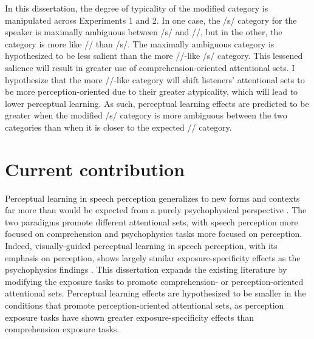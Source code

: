 In this dissertation, the degree of typicality of the modified category is manipulated across Experiments 1 and 2.  
In one case, the /s/ category for the speaker is maximally ambiguous between /s/ and /\textesh/, but in the other, the category is more like /\textesh/ than /s/.
The maximally ambiguous category is hypothesized to be less salient than the more /\textesh/-like /s/ category.
This lessened salience will result in greater use of comprehension-oriented attentional sets.
I hypothesize that the more /\textesh/-like category will shift listeners' attentional sets to be more perception-oriented due to their greater atypicality, which will lead to lower perceptual learning.
As such, perceptual learning effects are predicted to be greater when the modified /s/ category is more ambiguous between the two categories than when it is closer to the expected /\textesh/ category.

\section{Current contribution}

Perceptual learning in speech perception generalizes to new forms and contexts far more than would be expected from a purely psychophysical perspective \citep{Norris2003,Gilbert2001}.
The two paradigms promote different attentional sets, with speech perception more focused on comprehension and psychophysics tasks more focused on perception.  
Indeed, visually-guided perceptual learning in speech perception, with its emphasis on perception, shows largely similar exposure-specificity effects as the psychophysics findings \citep{Reinisch2014}.
This dissertation expands the existing literature by modifying the exposure tasks to promote comprehension- or perception-oriented attentional sets.
Perceptual learning effects are hypothesized to be smaller in the conditions that promote perception-oriented attentional sets, as perception exposure tasks have shown greater exposure-specificity effects than comprehension exposure tasks.

